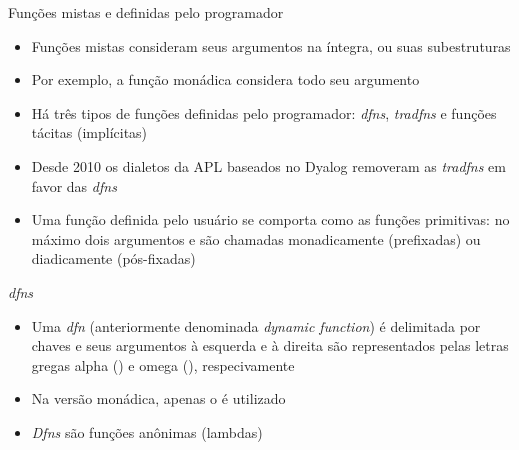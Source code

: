 \begin{frame}[fragile]{Funções mistas e definidas pelo programador}

    \begin{itemize}
        \item Funções mistas consideram seus argumentos na íntegra, ou suas subestruturas
        \pause

        \item Por exemplo, a função  monádica considera todo seu argumento
        \pause

        \item Há três tipos de funções definidas pelo programador: \textit{dfns}, \textit{tradfns}
            e funções tácitas (implícitas)
        \pause

        \item Desde 2010 os dialetos da APL baseados no Dyalog removeram as \textit{tradfns} em 
            favor das \textit{dfns}
        \pause

        \item Uma função definida pelo usuário se comporta como as funções primitivas: no máximo dois argumentos e são chamadas monadicamente (prefixadas) ou diadicamente (pós-fixadas)
    \end{itemize}

\end{frame}

\begin{frame}[fragile]{\it dfns}

    \begin{itemize}
        \item Uma \textit{dfn} (anteriormente denominada \textit{dynamic function}) é delimitada por chaves e seus argumentos à esquerda e à direita são representados pelas letras gregas alpha () e omega (), respecivamente
        \pause

        \item Na versão monádica, apenas o  é utilizado
        \pause

        \item  \textit{Dfns} são funções anônimas (lambdas)
    \end{itemize}

\end{frame}

